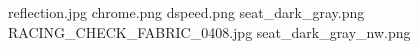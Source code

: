 reflection.jpg
chrome.png
dspeed.png
seat_dark_gray.png
RACING_CHECK_FABRIC_0408.jpg
seat_dark_gray_nw.png
